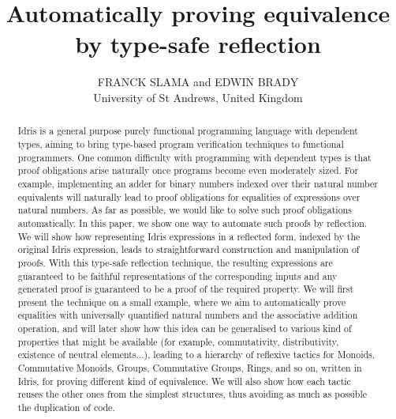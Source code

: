 \documentclass{jfp1}
\title[Automatically proving equivalence by type-safe reflection]
      {Automatically proving equivalence by type-safe reflection}
\author[Franck Slama and Edwin Brady]
        {FRANCK SLAMA and EDWIN BRADY\\
         University of St Andrews, United Kingdom\\
         \email{fs39@st-andrews.ac.uk, ecb10@st-andrews.ac.uk}}
\begin{document}
\label{firstpage}

\maketitle

\begin{abstract}
Idris is a general purpose purely functional programming language with dependent types, aiming to bring type-based program verification techniques to functional programmers. One common difficulty with programming with dependent types is that proof obligations arise naturally once programs become even moderately sized. For example, implementing an adder for binary numbers indexed over their natural number equivalents will naturally lead to proof obligations for equalities of expressions over natural numbers. 
As far as possible, we would like to solve such proof obligations automatically. In this paper, we show one way to automate such proofs by reflection. We will show how representing Idris expressions in a reflected form, indexed by the original Idris expression, leads to straightforward construction and manipulation of proofs.
With this type-safe reflection technique, the resulting expressions are guaranteed to be faithful representations of the corresponding inputs and any generated proof is guaranteed to be a proof of the required property. 
We will first present the technique on a small example, where we aim to automatically prove equalities with universally quantified natural numbers and the associative addition operation, and will later show how this idea can be generalised to various kind of properties that might be available (for example, commutativity, distributivity, existence of neutral elements...), leading to a hierarchy of reflexive tactics for Monoids, Commutative Monoids, Groups, Commutative Groups, Rings, and so on, written in Idris, for proving different kind of equivalence. We will also show how each tactic reuses the other ones from the simplest structures, thus avoiding as much as possible the duplication of code.
\end{abstract}












\end{document}
